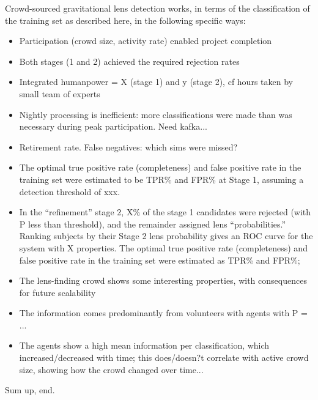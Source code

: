 \documentclass[useAMS,usenatbib,a4paper]{mn2e}
\begin{document}
Crowd-sourced gravitational lens detection works, in terms of the
classification of the training set as described here, in the following
specific ways: 

\begin{itemize} 

\item Participation (crowd size, activity rate) enabled project completion

\item Both stages (1 and 2) achieved the required rejection rates

\item Integrated humanpower = X (stage 1) and y (stage 2), cf hours taken by
small team of experts 

\item Nightly processing is inefficient: more classifications were made than
was necessary during peak participation. Need kafka...

\item Retirement rate. False negatives: which sims were missed?

\item The optimal true positive rate (completeness) and false positive rate in
the training set were estimated to be TPR\% and FPR\% at Stage 1, assuming a
detection threshold of xxx.  

\item In the ``refinement'' stage 2, X\% of the stage 1 candidates were
rejected (with P less than threshold), and the remainder assigned lens
``probabilities.'' Ranking
subjects by their Stage 2 lens probability gives an ROC curve for the system
with X properties. The optimal true positive rate (completeness) and false
positive rate in the training set were estimated as TPR\% and FPR\%; 

\item The lens-finding crowd shows some interesting properties, with
consequences for future scalability

\item The information comes predominantly from volunteers with agents with P =
...

\item The agents show a high mean information per classification, which
increased/decreased with time; this does/doesn?t correlate with active crowd
size, showing how the crowd changed over time...

\end{itemize}

Sum up, end.
\end{document}
